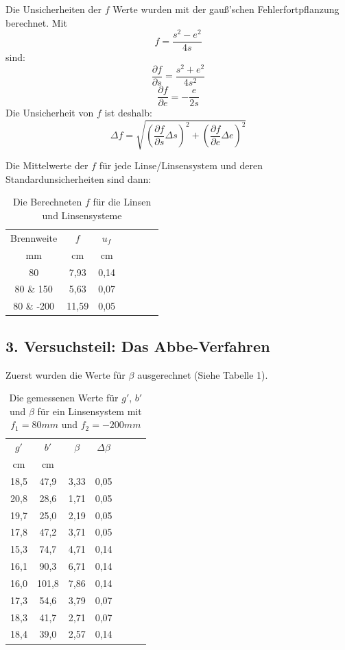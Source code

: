 \documentclass[11pt,a4paper]{article}
\begin{document}
Die Unsicherheiten der $f$ Werte wurden mit der gauß'schen Fehlerfortpflanzung berechnet. Mit 
$$ f = \frac{s^2-e^2}{4s}$$
sind:
$$ \frac{\partial f}{\partial{s}} = \frac{s^2+e^2}{4s^2}$$
$$\frac{\partial f}{\partial{e}} = -\frac{e}{2s}$$
Die Unsicherheit von $f$ ist deshalb:
$$\Delta f = \sqrt{(\frac{\partial f}{\partial{s}}\Delta s)^2 + (\frac{\partial f}{\partial{e}} \Delta e)^2}$$

Die Mittelwerte der $f$ für jede Linse/Linsensystem und deren Standardunsicherheiten sind dann:


 



\begin{table} [h]
	\centering
	\begin{tabular*}{0.50\textwidth}{@{\extracolsep{\fill}}c|cccccc}
		\toprule
		Brennweite & $f$ & $u_f$   \\
		mm & cm & cm \\
		\bottomrule
		80 & 7,93 & 0,14 \\
		80 \& 150 & 5,63 & 0,07 \\
		80 \& -200 & 11,59 & 0,05 \\
		\bottomrule
	\end{tabular*}
	\caption{Die Berechneten $f$ für die Linsen und Linsensysteme}
\end{table}

\subsection{3. Versuchsteil: Das Abbe-Verfahren}
Zuerst wurden die Werte für $\beta$ ausgerechnet (Siehe Tabelle 1).



\begin{table}[h]
	\centering
	\begin{tabular*}{0.50\textwidth}{@{\extracolsep{\fill}}cc|ccccc}
		\toprule
		$g'$ & $b'$ & $\beta$ & $\Delta \beta$   \\
		cm & cm& &\\
		18,5&47,9&3,33&0,05\\
		20,8&28,6&1,71&0,05\\
		19,7&25,0&2,19&0,05\\
		17,8&47,2&3,71&0,05\\
		15,3&74,7&4,71&0,14\\
		16,1&90,3&6,71&0,14\\
		16,0&101,8&7,86&0,14\\
		17,3&54,6&3,79&0,07\\
		18,3&41,7&2,71&0,07\\
		18,4&39,0&2,57&0,14\\
		\bottomrule
	\end{tabular*}
	\caption{Die gemessenen Werte für $g'$, $b'$ und $\beta$ für ein Linsensystem mit $f_1 = 80mm$ und $f_2 = -200mm$}
\end{table}
\end{document}
